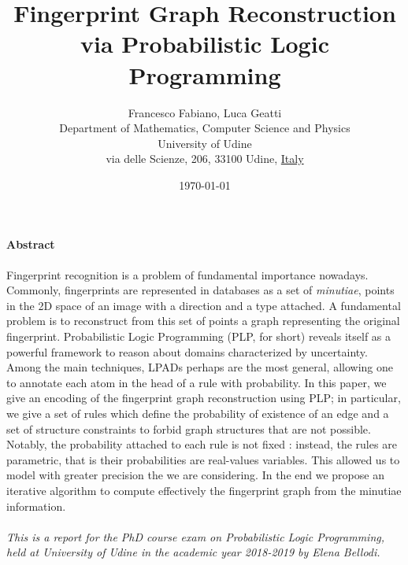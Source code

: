 \documentclass[8pt]{article}
\title{Fingerprint Graph Reconstruction via Probabilistic
       Logic Programming}
\author{
        Francesco Fabiano, Luca Geatti\\
        \footnotesize Department of Mathematics, Computer Science and Physics \\
        \footnotesize University of Udine\\
        \footnotesize via delle Scienze, 206, 33100 Udine, \underline{Italy}
}
\date{\footnotesize\today}
\begin{document}
\maketitle
\paragraph{Abstract}
Fingerprint recognition is a problem of fundamental importance nowadays.
Commonly, fingerprints are represented in databases as a set of
\emph{minutiae}, \ie points in the 2D space of an image with a direction and
a type attached. A fundamental problem is to reconstruct from this set of
points a graph representing the original fingerprint.  Probabilistic Logic Programming (PLP, for short)
reveals itself as a powerful framework to reason about domains characterized
by uncertainty. Among the main techniques, LPADs
perhaps are the most general, allowing one to annotate each atom in the head of
a rule with probability.  In this paper, we give an encoding of the
fingerprint graph reconstruction using PLP; in particular, we give a set of
rules which define the probability of existence of an edge and a set of
structure constraints to forbid graph structures that are not possible.
Notably, the probability attached
to each rule is not fixed \apriori: instead, the rules are
parametric, that is their probabilities are real-values variables. This allowed
us to model with greater precision the we are considering.  In the end we
propose an iterative algorithm to compute effectively the fingerprint graph from 
the minutiae information.\\~\\
\emph{This is a report for the PhD course exam on Probabilistic Logic Programming, 
held at University of Udine in the academic year 2018-2019 by Elena Bellodi.}
\end{document}
